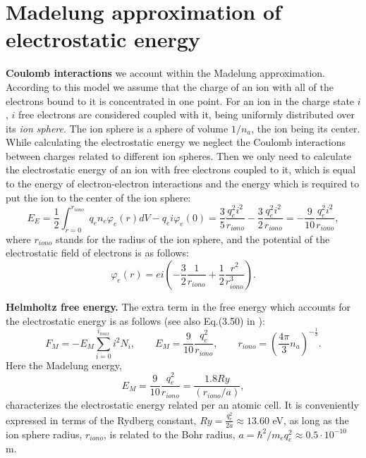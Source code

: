 \section{Madelung approximation of electrostatic energy}
{\bf Coulomb interactions} we account within the Madelung approximation.
According to this model we assume that the charge of an ion with all of the
electrons bound to it is concentrated in one point. For an ion in the charge state $i$,
$i$ free electrons are considered coupled with it, being uniformly distributed over its {\it ion sphere}.
The ion sphere is a sphere of volume $1/n_a$, the ion being its center.
While calculating the electrostatic energy we neglect the Coulomb interactions between
charges related to different ion spheres. Then we only need to calculate the electrostatic energy
of an ion with free electrons coupled to it, which is equal to the energy of
electron-electron interactions and the energy which is required to put the ion
to the center of the ion sphere:
\begin{equation}
E_{E} = \frac12 \int_{r=0}^{r_{iono}}{q_e n_e \varphi_e(r) dV} - q_e i \varphi_e(0) =
\frac35 \frac{q_e^2 i^2}{r_{iono}} - \frac32 \frac{q_e^2 i^2}{r_{iono}} =
-\frac{9}{10} \frac{q_e^2 i^2}{r_{iono}},
\end{equation}
where $r_{iono}$ stands for the radius of the ion sphere, and the potential of
the electrostatic field of electrons is as follows:
\begin{equation}
\varphi_e(r) = ei \left( -\frac32 \frac{1}{r_{iono}} + \frac12 \frac{r^2}{r_{iono}^3} \right).
\end{equation}

{\bf Helmholtz free energy.}
The extra term in the free energy which accounts for the
electrostatic energy is as follows (see also Eq.(3.50) in \cite{drake}):
\begin{equation}\label{fterm}
F_M=-E_M \sum_{i=0}^{i_{max}} i^2 N_i,\qquad E_M=\frac{9}{10} \frac{q_e^2}{r_{iono}},\qquad
r_{iono} = \left( \frac{4 \pi}{3} n_a \right)^{-\frac13}.
\end{equation}
Here the Madelung energy,
\begin{equation}
E_M=\frac9{10}\frac{q_e^2}{r_{iono}}=\frac{1.8Ry}{(r_{iono}/a)},
\end{equation}
characterizes the electrostatic energy related per an atomic cell. It is conveniently expressed in terms of the Rydberg constant,  $Ry=\frac{q_e^2}{2a}\approx 13.60$ eV, as long as
the ion sphere radius, $r_{iono}$, is related to the Bohr radius, $a=\hbar^2/m_e q_e^2\approx0.5\cdot10^{-10}$ m.

